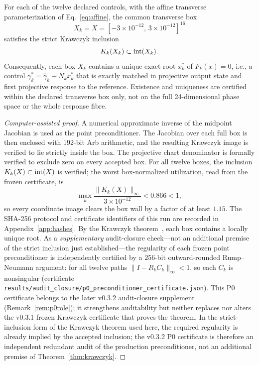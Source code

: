 \begin{theorem}\label{thm:krawczyk}
For each of the twelve declared controls, with the affine transverse parameterization of
Eq.~\eqref{eq:affine}, the common transverse box
\[
X_{k}=X=[-3\times10^{-12},\,3\times10^{-12}]^{16}
\]
satisfies the strict Krawczyk inclusion
\[
K_{k}(X_{k})\subset\operatorname{int}(X_{k}).
\]
Consequently, each box $X_{k}$ contains a unique exact root $x^{\ast}_{k}$ of
$F_{k}(x)=0$, i.e., a control
$\gamma^{\ast}_{k}=\widehat{\gamma}_{k}+N_{k}x^{\ast}_{k}$ that is exactly matched in
projective output state and first projective response to the reference. Existence and
uniqueness are certified within the declared transverse box only, not on the full
24-dimensional phase space or the whole response fibre.
\end{theorem}

\begin{proof}[Computer-assisted proof]
A numerical approximate inverse of the midpoint Jacobian is used as the point
preconditioner. The Jacobian over each full box is then enclosed with 192-bit Arb
arithmetic, and the resulting Krawczyk image is verified to lie strictly inside the box.
The projective chart denominator is formally verified to exclude zero on every accepted
box. For all twelve boxes, the inclusion $K_{k}(X)\subset\operatorname{int}(X)$ is verified; the worst
box-normalized utilization, read from the frozen certificate, is
\[
\max_{k}\frac{\lVert K_{k}(X)\rVert_{\infty}}{3\times10^{-12}}<0.866<1,
\]
so every coordinate image clears the box wall by a factor of at least $1.15$. The SHA-256
protocol and certificate identifiers of this run are recorded in
Appendix~\ref{app:hashes}. By the Krawczyk
theorem~\cite{moore2009,tucker2011,tucker2002}, each box contains a locally unique root.
As a \emph{supplementary} audit-closure check---not an additional premise of the strict
inclusion just established---the regularity of each frozen point preconditioner is
independently certified by a $256$-bit outward-rounded Rump--Neumann argument: for all
twelve paths $\lVert I-R_{k}C_{k}\rVert_{\infty}<1$, so each $C_{k}$ is nonsingular
(certificate \nolinkurl{results/audit_closure/p0_preconditioner_certificate.json}). This
P0 certificate belongs to the later v0.3.2 audit-closure supplement
(Remark~\ref{rem:p0role}); it strengthens auditability but neither replaces nor alters the
v0.3.1 frozen Krawczyk certificate that proves the theorem. In the strict-inclusion form
of the Krawczyk theorem used here, the required regularity is already implied by the
accepted inclusion; the v0.3.2 P0 certificate is therefore an independent redundant audit
of the production preconditioner, not an additional premise of Theorem~\ref{thm:krawczyk}.
\end{proof}

